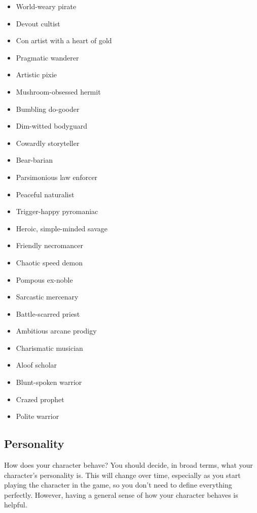         \begin{itemize}
            \item World-weary pirate
            \item Devout cultist
            \item Con artist with a heart of gold
            \item Pragmatic wanderer
            \item Artistic pixie
            \item Mushroom-obsessed hermit
            \item Bumbling do-gooder
            \item Dim-witted bodyguard
            \item Cowardly storyteller
            \item Bear-barian
            \item Parsimonious law enforcer
            \item Peaceful naturalist
            \item Trigger-happy pyromaniac
            \item Heroic, simple-minded savage
            \item Friendly necromancer
            \item Chaotic speed demon
            \item Pompous ex-noble
            \item Sarcastic mercenary
            \item Battle-scarred priest
            \item Ambitious arcane prodigy
            \item Charismatic musician
            \item Aloof scholar
            \item Blunt-spoken warrior
            \item Crazed prophet
            \item Polite warrior
        \end{itemize}

    \subsection{Personality}

        How does your character behave?
        You should decide, in broad terms, what your character's personality is.
        This will change over time, especially as you start playing the character in the game, so you don't need to define everything perfectly.
        However, having a general sense of how your character behaves is helpful.


